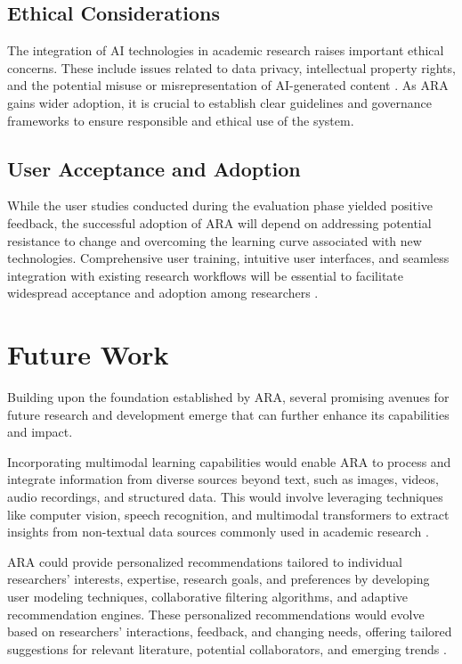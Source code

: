 \documentclass[a4paper,conference]{IEEEtran}
\begin{document}
\subsection{Ethical Considerations}
The integration of AI technologies in academic research raises important ethical concerns. These include issues related to data privacy, intellectual property rights, and the potential misuse or misrepresentation of AI-generated content \cite{aiethics}. As ARA gains wider adoption, it is crucial to establish clear guidelines and governance frameworks to ensure responsible and ethical use of the system.

\subsection{User Acceptance and Adoption}
While the user studies conducted during the evaluation phase yielded positive feedback, the successful adoption of ARA will depend on addressing potential resistance to change and overcoming the learning curve associated with new technologies. Comprehensive user training, intuitive user interfaces, and seamless integration with existing research workflows will be essential to facilitate widespread acceptance and adoption among researchers .

\section{Future Work}

Building upon the foundation established by ARA, several promising avenues for future research and development emerge that can further enhance its capabilities and impact.

Incorporating multimodal learning capabilities would enable ARA to process and integrate information from diverse sources beyond text, such as images, videos, audio recordings, and structured data. This would involve leveraging techniques like computer vision, speech recognition, and multimodal transformers to extract insights from non-textual data sources commonly used in academic research  \cite{multimodal}.

ARA could provide personalized recommendations tailored to individual researchers' interests, expertise, research goals, and preferences by developing user modeling techniques, collaborative filtering algorithms, and adaptive recommendation engines. These personalized recommendations would evolve based on researchers' interactions, feedback, and changing needs, offering tailored suggestions for relevant literature, potential collaborators, and emerging trends \cite{recommendations}.
\end{document}
